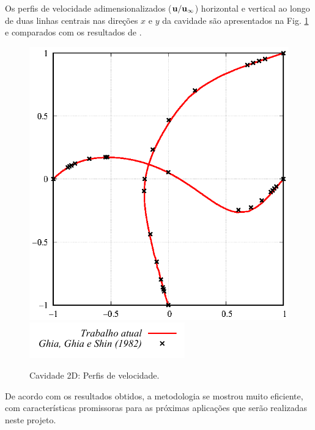 \documentclass[tese_patricia]{subfiles}
\begin{document}
Os perfis de velocidade adimensionalizados ($\mathbf{u}/\mathbf{u}_{\infty}$) horizontal e vertical ao longo de duas linhas centrais nas direções $x$ e $y$ da cavidade são apresentados na Fig. \ref{fig:cavidade_graficos_overlap} e comparados com os resultados de .

\begin{figure}[!htb]
	\centering
	{\includegraphics[scale=0.8,trim=0cm 0cm 0cm 0cm, clip=true]{Imagens/Cap5/cavidade_Re100.eps}}\\
	{\includegraphics[scale=1.0,trim=0cm 0cm 0cm 0cm, clip=true]{Imagens/Cap5/legenda.pdf}}
	\caption{Cavidade 2D: Perfis de velocidade.} 
	\label{fig:cavidade_graficos_overlap}
\end{figure}

De acordo com os resultados obtidos, a metodologia se mostrou muito eficiente, com características promissoras para as próximas aplicações que serão realizadas neste projeto.
%
%
\end{document}
